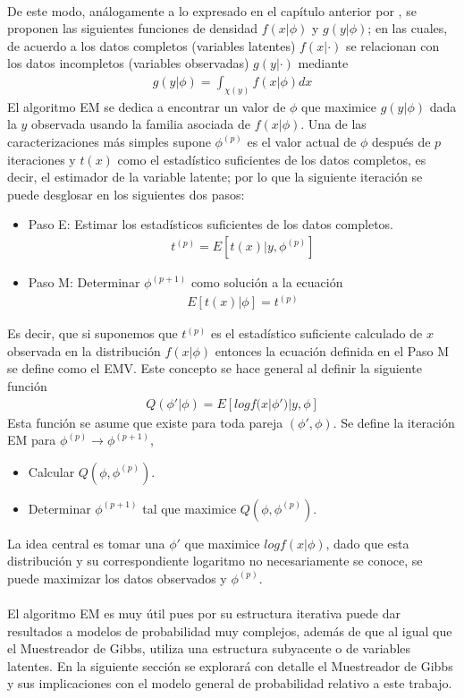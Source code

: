 \\
De este modo, an\'alogamente a lo expresado en el cap\'itulo anterior por \cite{pitt2002constructing}, se proponen las siguientes funciones de densidad $f(x|\phi)$ y $g(y|\phi)$; en las cuales, de acuerdo a \cite{dempster1977maximum} los datos completos (variables latentes) $f(x|\cdot)$ se relacionan con los datos incompletos (variables observadas) $g(y|\cdot)$ mediante
\begin{align*}
g(y|\phi)=\int_{\chi(y)} f(x|\phi)dx
\end{align*}
El algoritmo EM se dedica a encontrar un valor de $\phi$ que maximice $g(y|\phi)$ dada la $y$ observada usando la familia asociada de $f(x|\phi)$. Una de las caracterizaciones m\'as simples supone $\phi^{(p)}$ es el valor actual de $\phi$ despu\'es de $p$ iteraciones y $t(x)$ como el estad\'istico suficientes de los datos completos, es decir, el estimador de la variable latente; por lo que la siguiente iteraci\'on se puede desglosar en los siguientes dos pasos:
\begin{itemize}
\item Paso E: Estimar los estad\'isticos suficientes de los datos completos.
	\begin{align*}
	t^{(p)}=E[t(x)|y,\phi^{(p)}]
	\end{align*}
\item Paso M: Determinar $\phi^{(p+1)}$ como soluci\'on a la ecuaci\'on
	\begin{align*}
	E[t(x)|\phi]=t^{(p)}
	\end{align*}
\end{itemize}
Es decir, que si suponemos que $t^{(p)}$ es el estad\'istico suficiente calculado de $x$ observada en la distribuci\'on $f(x|\phi)$ entonces la ecuaci\'on definida en el Paso M se define como el EMV. Este concepto se hace general al definir la siguiente funci\'on
\begin{align*}
Q(\phi'|\phi)=E[log f(x|\phi')|y,\phi]
\end{align*}
Esta funci\'on se asume que existe para toda pareja $(\phi',\phi)$. Se define la iteraci\'on EM para $\phi^{(p)} \to \phi^{(p+1)}$,
\begin{itemize}
\item Calcular $Q(\phi,\phi^{(p)})$.
\item Determinar $\phi^{(p+1)}$ tal que maximice $Q(\phi,\phi^{(p)})$.
\end{itemize}
La idea central es tomar una $\phi'$ que maximice $log f(x|\phi)$, dado que esta distribuci\'on y su correspondiente logaritmo no necesariamente se conoce, se puede maximizar los datos observados y $\phi^{(p)}$.\\
\\
El algoritmo EM es muy \'util pues por su estructura iterativa puede dar resultados a modelos de probabilidad muy complejos, adem\'as de que al igual que el Muestreador de Gibbs, utiliza una estructura subyacente o de variables latentes. En la siguiente secci\'on se explorar\'a con detalle el Muestreador de Gibbs y sus implicaciones con el modelo general de probabilidad relativo a este trabajo.

